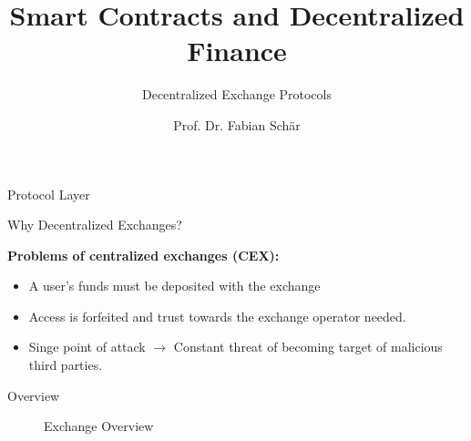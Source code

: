 \documentclass[]{beamer}
\title{Smart Contracts and Decentralized Finance}
\subtitle{Decentralized Exchange Protocols}
\author{Prof. Dr. Fabian Schär}
\institute{University of Basel}
\begin{document}
\thispagestyle{empty}
\begin{frame}[noframenumbering]
	\titlepage
\end{frame}


\begin{frame}{Protocol Layer}
\begin{figure}
	\centering
	\resizebox{0.8\textwidth}{!}{
	\begin{tikzpicture}[scale=1.0, every node/.style={scale=1.0}]
		
	\end{tikzpicture}}	
\end{figure}
\end{frame}



\begin{frame}{Why Decentralized Exchanges?}

	\textbf{Problems of centralized exchanges (CEX):}
		\begin{small}
		\begin{itemize}
			\item A user's funds must be deposited with the exchange
			\item Access is forfeited and trust towards the exchange operator needed.
			\item Singe point of attack $\rightarrow$ Constant threat of becoming target of malicious third parties.
		\end{itemize}
		\end{small}	

\vspace{1.5em}

\end{frame}

\begin{frame}{Overview}
	\begin{figure}[h!]
		
		\caption*{Exchange Overview \cite{FS:21}}
	\end{figure}
\end{frame}	
\end{document}
